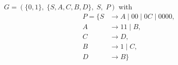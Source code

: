 \documentclass{article}
\begin{document}
$G=\left(\{0, 1\},\;\{ S, A, C, B, D\},\;S,\;P\right)$ with
\begin{align*}
	P=\{	S &\rightarrow A\;|\;00\;|\;0C\;|\;0000, \\ 
	A &\rightarrow 11\;|\;B, \\ 
	C &\rightarrow D, \\ 
	B &\rightarrow 1\;|\;C, \\ 
	D &\rightarrow B\}
	\end{align*}
\end{document}
